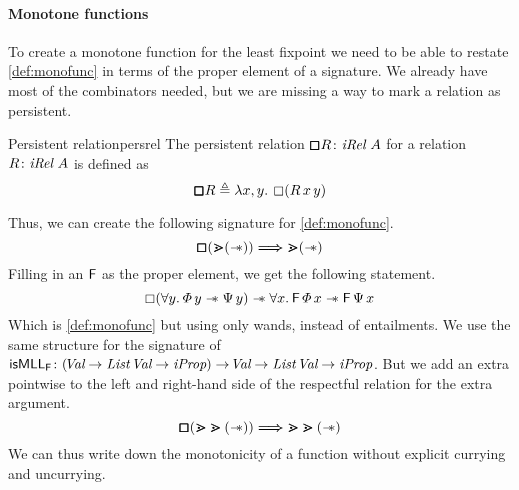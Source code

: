 \documentclass[thesis.tex]{subfiles}
\begin{document}
\paragraph*{Monotone functions}
To create a monotone function for the least fixpoint we need to be able to restate \cref{def:monofunc} in terms of the proper element of a signature. We already have most of the combinators needed, but we are missing a way to mark a relation as persistent.
\begin{definition}{Persistent relation}{persrel}
    The persistent relation $\persrel\rel\colon\Rel\ \sigax$ for a relation $\rel\colon\Rel\ \sigax$ is defined as
    \[\persrel\rel \eqdef \Lam\var,\varB. \always (\rel\,\var\,\varB)\]
\end{definition}
Thus, we can create the following signature for \cref{def:monofunc}.
\[\pmb{\mathop{\boxempty}} (\bm{\gtrdot} (\mathrel{-\!\!\ast})) \mathrel{\bm{\Longrightarrow}} \bm{\gtrdot} (\mathrel{-\!\!\ast})\]
Filling in an $\textsf{\upshape F}$ as the proper element, we get the following statement.
\[ \always(\All \varB. \pred\,\varB \wand \predB\,\varB) \wand \All \var. \hopred\,\pred\,\var \wand \hopred\,\predB\,\var \]
Which is \cref{def:monofunc} but using only wands, instead of entailments. We use the same structure for the signature of $\textsf{\upshape isMLL}_{\textsf{\upshape F}}\colon (\kern-0.2em\textit{Val} \to \textit{List}\ \kern-0.2em\textit{Val} \to \textit{iProp}) \to \kern-0.2em\textit{Val} \to \textit{List}\ \kern-0.2em\textit{Val} \to \textit{iProp}$. But we add an extra pointwise to the left and right-hand side of the respectful relation for the extra argument.
\[\pmb{\mathop{\boxempty}} (\bm{\gtrdot}\bm{\gtrdot} (\mathrel{-\!\!\ast})) \mathrel{\bm{\Longrightarrow}} \bm{\gtrdot}\bm{\gtrdot} (\mathrel{-\!\!\ast})\]
We can thus write down the monotonicity of a function without explicit currying and uncurrying.
\end{document}
